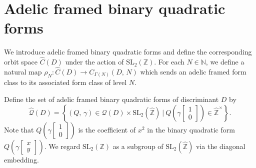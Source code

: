 \documentclass[reqno,11pt]{article}
\theoremstyle{plain} %
\theoremstyle{definition} %
\begin{document}
\section {Adelic framed binary quadratic forms}

We introduce adelic framed binary quadratic forms and 
define the corresponding orbit space $\widehat{C}(D)$ under the action of
$\mathrm{SL}_2(\mathbb{Z})$. 
For each $N\in\mathbb{N}$, we define a natural map
$\rho_N:\widehat{C}(D)\rightarrow C_{\Gamma(N)}(D,\,N)$
which sends an adelic framed form class to its associated form class of level $N$.
\par
Define the set of adelic framed binary quadratic forms of discriminant $D$ by
\begin{equation*}
\widehat{\mathcal{Q}}(D)
=\left\{(Q,\,\gamma)\in\mathcal{Q}(D)\times\mathrm{SL}_2(\widehat{\mathbb{Z}})~|~
Q\left(\gamma\begin{bmatrix}1\\0\end{bmatrix}\right)\in
\widehat{\mathbb{Z}}^\times\right\}.
\end{equation*}
Note that $Q\left(\gamma\begin{bmatrix}1\\0\end{bmatrix}\right)$ is
the coefficient of $x^2$ in the binary quadratic form
$Q\left(\gamma\begin{bmatrix}x\\y\end{bmatrix}\right)$.
We regard $\mathrm{SL}_2(\mathbb{Z})$ as a subgroup of
$\mathrm{SL}_2(\widehat{\mathbb{Z}})$ via the diagonal embedding.
\end{document}
